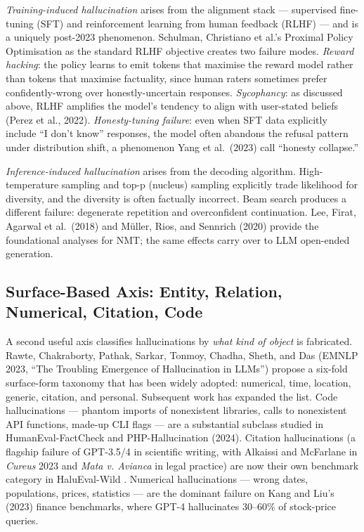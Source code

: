 \documentclass{article}
\begin{document}
\emph{Training-induced hallucination} arises from the alignment stack --- supervised fine-tuning (SFT) and reinforcement learning from human feedback (RLHF) --- and is a uniquely post-2023 phenomenon. Schulman, Christiano et al.'s Proximal Policy Optimisation as the standard RLHF objective creates two failure modes. \emph{Reward hacking}: the policy learns to emit tokens that maximise the reward model rather than tokens that maximise factuality, since human raters sometimes prefer confidently-wrong over honestly-uncertain responses. \emph{Sycophancy}: as discussed above, RLHF amplifies the model's tendency to align with user-stated beliefs (Perez et al., 2022). \emph{Honesty-tuning failure}: even when SFT data explicitly include ``I don't know'' responses, the model often abandons the refusal pattern under distribution shift, a phenomenon Yang et al.~(2023) call ``honesty collapse.''

\emph{Inference-induced hallucination} arises from the decoding algorithm. High-temperature sampling and top-p (nucleus) sampling explicitly trade likelihood for diversity, and the diversity is often factually incorrect. Beam search produces a different failure: degenerate repetition and overconfident continuation. Lee, Firat, Agarwal et al.~(2018) and Müller, Rios, and Sennrich (2020) provide the foundational analyses for NMT; the same effects carry over to LLM open-ended generation.

\subsection{Surface-Based Axis: Entity, Relation, Numerical, Citation, Code}\label{surface-based-axis-entity-relation-numerical-citation-code}

A second useful axis classifies hallucinations by \emph{what kind of object} is fabricated. Rawte, Chakraborty, Pathak, Sarkar, Tonmoy, Chadha, Sheth, and Das (EMNLP 2023, ``The Troubling Emergence of Hallucination in LLMs'') propose a six-fold surface-form taxonomy that has been widely adopted: numerical, time, location, generic, citation, and personal. Subsequent work has expanded the list. Code hallucinations --- phantom imports of nonexistent libraries, calls to nonexistent API functions, made-up CLI flags --- are a substantial subclass studied in HumanEval-FactCheck and PHP-Hallucination (2024). Citation hallucinations (a flagship failure of GPT-3.5/4 in scientific writing, with Alkaissi and McFarlane in \emph{Cureus} 2023 and \emph{Mata v. Avianca} in legal practice) are now their own benchmark category in HaluEval-Wild \citep{zhu2024haluevalwildevalua}. Numerical hallucinations --- wrong dates, populations, prices, statistics --- are the dominant failure on Kang and Liu's (2023) finance benchmarks, where GPT-4 hallucinates 30--60\% of stock-price queries.
\end{document}

